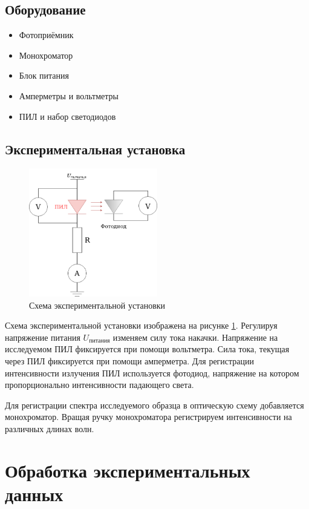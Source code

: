 \documentclass[a4paper, 12pt]{extarticle}
\begin{document}
\subsection*{\textcolor{sub_header}{Оборудование}}
\begin{itemize}
    \item Фотоприёмник
    \item Монохроматор
    \item Блок питания
    \item Амперметры и вольтметры
    \item ПИЛ и набор светодиодов
\end{itemize}

\subsection*{\textcolor{sub_header}{Экспериментальная установка}}


\begin{figure}[htbp]
    \centering
    \includegraphics[width = 0.5\textwidth]{scheme.png}
    \caption{Схема экспериментальной установки}
    \label{fig:setup}
\end{figure}

Схема экспериментальной установки изображена на рисунке \ref{fig:setup}. Регулируя напряжение питания $U_{\text{питания}}$ изменяем силу тока накачки. Напряжение на исследуемом ПИЛ фиксируется при помощи вольтметра. Сила тока, текущая через ПИЛ фиксируется при помощи амперметра. Для регистрации интенсивности излучения ПИЛ используется фотодиод, напряжение на котором пропорционально интенсивности падающего света.

Для регистрации спектра исследуемого образца в оптическую схему добавляется монохроматор. Вращая ручку монохроматора регистрируем интенсивности на различных длинах волн.

\section*{\textcolor{header}{Обработка экспериментальных данных}}
\end{document}

